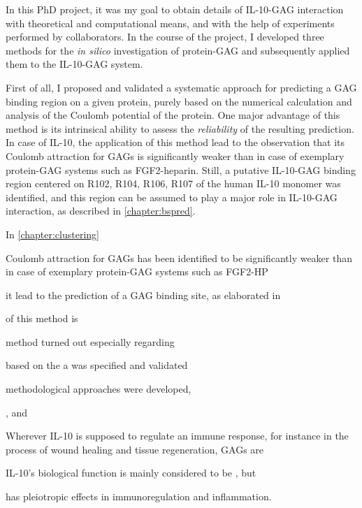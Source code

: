 In this PhD project, it was my goal to obtain details of IL-10-GAG interaction
with theoretical and computational means, and with the help of experiments
performed by collaborators. In the course of the project, I developed three
methods for the \textit{in silico} investigation of protein-GAG and subsequently
applied them to the IL-10-GAG system.

First of all, I proposed and validated a systematic approach for predicting a
GAG binding region on a given protein, purely based on the numerical calculation
and analysis of the Coulomb potential of the protein. One major advantage of
this method is its intrinsical ability to assess the \textit{reliability} of the
resulting prediction. In case of IL-10, the application of this method lead to
the observation that its Coulomb attraction for GAGs is significantly weaker
than in case of exemplary protein-GAG systems such as FGF2-heparin. Still, a
putative IL-10-GAG binding region centered on R102, R104, R106, R107 of the
human IL-10 monomer was identified, and this region can be assumed to play a
major role in IL-10-GAG interaction, as described in \cref{chapter:bspred}.

In \cref{chapter:clustering}




Coulomb attraction for GAGs has been identified to be
significantly weaker than in case of exemplary protein-GAG systems such as
FGF2-HP


it lead to the prediction of a GAG binding site, as elaborated in




of this method is

 method turned out
especially regarding





 based on the a
was specified and validated



methodological approaches were developed,

, and



Wherever IL-10 is supposed to
regulate an immune response, for instance in the process of wound healing and
tissue regeneration, GAGs are


 IL-10's biological function is mainly considered to be
, but

 has pleiotropic effects in immunoregulation and
inflammation.




